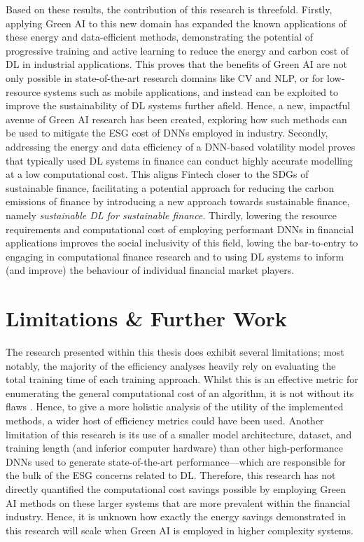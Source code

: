 \documentclass[a4paper, 11pt]{report}
\begin{document}
    Based on these results, the contribution of this research is threefold. Firstly, applying Green AI to this new domain has expanded the known applications of these energy and data-efficient methods, demonstrating the potential of progressive training and active learning to reduce the energy and carbon cost of DL in industrial applications. This proves that the benefits of Green AI are not only possible in state-of-the-art research domains like CV and NLP, or for low-resource systems such as mobile applications, and instead can be exploited to improve the sustainability of DL systems further afield. Hence, a new, impactful avenue of Green AI research has been created, exploring how such methods can be used to mitigate the ESG cost of DNNs employed in industry. Secondly, addressing the energy and data efficiency of a DNN-based volatility model proves that typically used DL systems in finance can conduct highly accurate modelling at a low computational cost. This aligns Fintech closer to the SDGs of sustainable finance, facilitating a potential approach for reducing the carbon emissions of finance by introducing a new approach towards sustainable finance, namely \emph{sustainable DL for sustainable finance}. Thirdly, lowering the resource requirements and computational cost of employing performant DNNs in financial applications improves the social inclusivity of this field, lowing the bar-to-entry to engaging in computational finance research and to using DL systems to inform (and improve) the behaviour of individual financial market players.


    \section{Limitations \& Further Work}

    The research presented within this thesis does exhibit several limitations; most notably, the majority of the efficiency analyses heavily rely on evaluating the total training time of each training approach. Whilst this is an effective metric for enumerating the general computational cost of an algorithm, it is not without its flaws \citep{schwartz-2019}. Hence, to give a more holistic analysis of the utility of the implemented methods, a wider host of efficiency metrics could have been used. Another limitation of this research is its use of a smaller model architecture, dataset, and training length (and inferior computer hardware) than other high-performance DNNs used to generate state-of-the-art performance---which are responsible for the bulk of the ESG concerns related to DL. Therefore, this research has not directly quantified the computational cost savings possible by employing Green AI methods on these larger systems that are more prevalent within the financial industry. Hence, it is unknown how exactly the energy savings demonstrated in this research will scale when Green AI is employed in higher complexity systems. 
\end{document}
